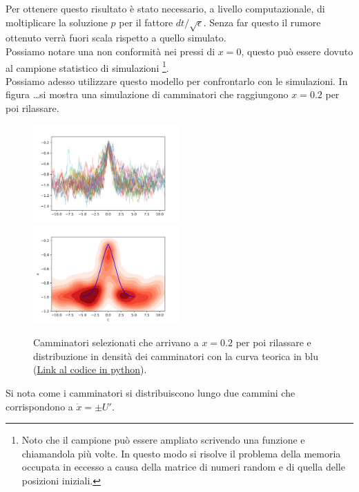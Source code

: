 \noindent
Per ottenere questo risultato è stato necessario, a livello computazionale, di moltiplicare la soluzione $p$ per il fattore $dt / \sqrt{\epsilon}$. 
Senza far questo il rumore ottenuto verrà fuori scala rispetto a quello simulato.\\
Possiamo notare una non conformità nei pressi di $x=0$, questo può essere dovuto al campione statistico di simulazioni
\footnote{Noto che il campione può essere ampliato scrivendo una funzione e chiamandola più volte. In questo modo si risolve il problema della memoria occupata in eccesso a causa della matrice di numeri random e di quella delle posizioni iniziali.}.\\
Possiamo adesso utilizzare questo modello per confrontarlo con le simulazioni. In figura \ldots si mostra una simulazione di camminatori che raggiungono $x= 0.2$ per poi rilassare.
\begin{figure}[H]
    \centering
    \includegraphics[width=0.5\textwidth]{figures/lez_12_walker_t_cutted.png}
    \includegraphics[width=0.5\textwidth]{figures/lez_12_walker_t_cutted_theory.png}
    \caption{\scriptsize Camminatori selezionati che arrivano a $x = 0.2$ per poi rilassare e distribuzione in densità dei camminatori con la curva teorica in blu (\href{https://github.com/dodogabrie/Sistemi-Complessi/blob/master/python-project/lezione12/MFPT_simulation_py.ipynb}{Link al codice in python}).}
    \label{fig:figures-lez_12_walker_t_cutted_theory-png}
\end{figure}
\noindent
Si nota come i camminatori si distribuiscono lungo due cammini che corrispondono a $\dot{x} = \pm U'$.
